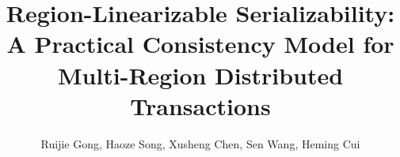 \documentclass[lettersize,journal]{IEEEtran}
\begin{document}
    

\title{Region-Linearizable Serializability: A Practical Consistency Model for  Multi-Region Distributed Transactions}

\author{Ruijie Gong, Haoze Song, Xusheng Chen, Sen Wang, Heming Cui}




\maketitle


\begin{abstract}
    
\end{abstract}




















\end{document}
